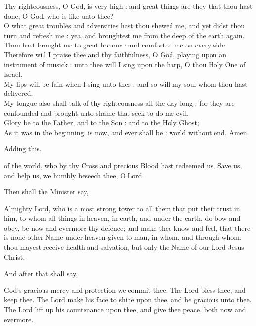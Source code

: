 Thy righteousness, O God, is very high : and great things are they that thou hast done; O God, who is like unto thee?\\
O what great troubles and adversities hast thou shewed me, and yet didst thou turn and refresh me : yea, and broughtest me from the deep of the earth again.\\
Thou hast brought me to great honour : and comforted me on every side.\\
Therefore will I praise thee and thy faithfulness, O God, playing upon an instrument of musick : unto thee will I sing upon the harp, O thou Holy One of Israel.\\
My lips will be fain when I sing unto thee : and so will my soul whom thou hast delivered.\\
My tongue also shall talk of thy righteousness all the day long : for they are confounded and brought unto shame that seek to do me evil.\\
\newpage
Glory be to the Father, and to the Son : and to the Holy Ghost;\\
As it was in the beginning, is now, and ever shall be : world without end. Amen.

\begin{rubric}
Adding this.
\end{rubric}

 of the world, who by thy Cross and precious Blood hast redeemed us, Save us, and help us, we humbly beseech thee, O Lord.

\begin{rubric}
Then shall the Minister say,
\end{rubric}

 Almighty Lord, who is a most strong tower to all them that put their trust in him, to whom all things in heaven, in earth, and under the earth, do bow and obey, be now and evermore thy defence; and make thee know and feel, that there is none other Name under heaven given to man, in whom, and through whom, thou mayest receive health and salvation, but only the Name of our Lord Jesus Christ.

\begin{rubric}
And after that shall say,
\end{rubric}

 God's gracious mercy and protection we commit thee. The Lord bless thee, and keep thee. The Lord make his face to shine upon thee, and be gracious unto thee. The Lord lift up his countenance upon thee, and give thee peace, both now and evermore.

